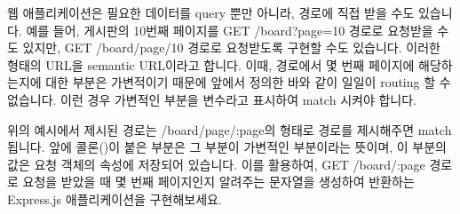 웹 애플리케이션은 필요한 데이터를 query 뿐만 아니라, 경로에 직접 받을 수도 있습니다. 예를 들어, 게시판의 10번째 페이지를 GET /board?page=10 경로로 요청받을 수도 있지만, GET /board/page/10 경로로 요청받도록 구현할 수도 있습니다. 이러한 형태의 URL을 semantic URL이라고 합니다. 이때, 경로에서 몇 번째 페이지에 해당하는지에 대한 부분은 가변적이기 때문에 앞에서 정의한 바와 같이 일일이 routing 할 수 없습니다. 이런 경우 가변적인 부분을 변수라고 표시하여 match 시켜야 합니다.

위의 예시에서 제시된 경로는 /board/page/:page의 형태로 경로를 제시해주면 match됩니다. 앞에 콜론(\cd{:})이 붙은 부분은 그 부분이 가변적인 부분이라는 뜻이며, 이 부분의 값은 요청 객체의  속성에 저장되어 있습니다. 이를 활용하여, GET /board/:page 경로로 요청을 받았을 때 몇 번째 페이지인지 알려주는 문자열을 생성하여 반환하는 Express.js 애플리케이션을 구현해보세요.
